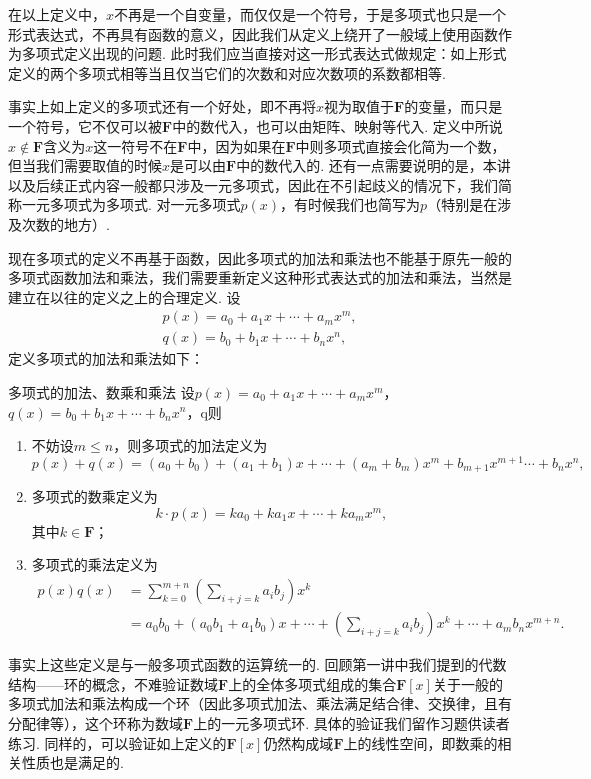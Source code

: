 在以上定义中，$x$不再是一个自变量，而仅仅是一个符号，于是多项式也只是一个形式表达式，不再具有函数的意义，因此我们从定义上绕开了一般域上使用函数作为多项式定义出现的问题. 此时我们应当直接对这一形式表达式做规定：如上形式定义的两个多项式相等当且仅当它们的次数和对应次数项的系数都相等.

事实上如上定义的多项式还有一个好处，即不再将$x$视为取值于$\mathbf{F}$的变量，而只是一个符号，它不仅可以被$\mathbf{F}$中的数代入，也可以由矩阵、映射等代入. 定义中所说$x\notin\mathbf{F}$含义为$x$这一符号不在$\mathbf{F}$中，因为如果在$\mathbf{F}$中则多项式直接会化简为一个数，但当我们需要取值的时候$x$是可以由$\mathbf{F}$中的数代入的. 还有一点需要说明的是，本讲以及后续正式内容一般都只涉及一元多项式，因此在不引起歧义的情况下，我们简称一元多项式为多项式. 对一元多项式$p(x)$，有时候我们也简写为$p$（特别是在涉及次数的地方）.

现在多项式的定义不再基于函数，因此多项式的加法和乘法也不能基于原先一般的多项式函数加法和乘法，我们需要重新定义这种形式表达式的加法和乘法，当然是建立在以往的定义之上的合理定义. 设
\begin{gather*}
    p(x)=a_0+a_1x+\cdots+a_mx^m,\\
    q(x)=b_0+b_1x+\cdots+b_nx^n,
\end{gather*}
定义多项式的加法和乘法如下：
\begin{definition}{多项式的加法、数乘和乘法}{}
    设$p(x)=a_0+a_1x+\cdots+a_mx^m$，$q(x)=b_0+b_1x+\cdots+b_nx^n$，q则
    \begin{enumerate}
        \item 不妨设$m\leqslant n$，则多项式的加法定义为
              \[p(x)+q(x)=(a_0+b_0)+(a_1+b_1)x+\cdots+(a_m+b_m)x^m+b_{m+1}x^{m+1}\cdots+b_nx^n,\]
        \item 多项式的数乘定义为
              \[k\cdot p(x)=ka_0+ka_1x+\cdots+ka_mx^m,\]
              其中$k\in\mathbf{F}$；
        \item 多项式的乘法定义为
              \begin{align*}
                  p(x)q(x) & =\sum_{k=0}^{m+n}\left(\sum_{i+j=k}a_ib_j\right)x^k                                      \\
                           & =a_0b_0+(a_0b_1+a_1b_0)x+\cdots+\left(\sum_{i+j=k}a_ib_j\right)x^k+\cdots+a_mb_nx^{m+n}.
              \end{align*}
    \end{enumerate}
\end{definition}
事实上这些定义是与一般多项式函数的运算统一的. 回顾第一讲中我们提到的代数结构——环的概念，不难验证数域$\mathbf{F}$上的全体多项式组成的集合$\mathbf{F}[x]$关于一般的多项式加法和乘法构成一个环（因此多项式加法、乘法满足结合律、交换律，且有分配律等），这个环称为数域$\mathbf{F}$上的一元多项式环. 具体的验证我们留作习题供读者练习. 同样的，可以验证如上定义的$\mathbf{F}[x]$仍然构成域$\mathbf{F}$上的线性空间，即数乘的相关性质也是满足的.

